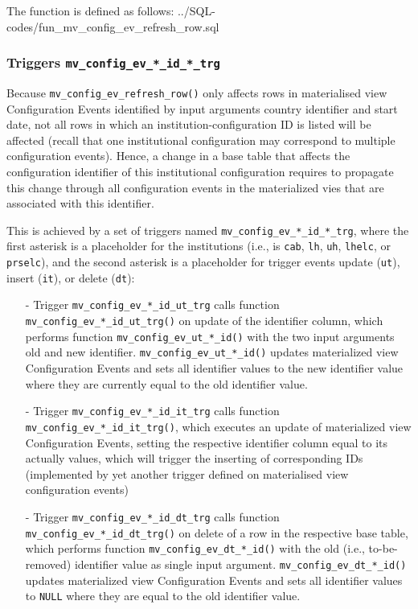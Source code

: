 The function is defined as follows:
%
{../SQL-codes/fun_mv_config_ev_refresh_row.sql}

\subsubsection{Triggers \texttt{mv\_config\_ev\_*\_id\_*\_trg}}

Because \texttt{mv\_config\_ev\_refresh\_row()} only affects rows in materialised view Configuration Events identified by input arguments country identifier and start date, not all rows in which an institution-configuration ID is listed will be affected (recall that one institutional configuration may correspond to multiple configuration events).
Hence, a change in a base table that affects the configuration identifier of this institutional configuration requires to propagate this change through all configuration events in the materialized vies that are associated with this identifier. 

This is achieved by a set of triggers named \texttt{mv\_config\_ev\_*\_id\_*\_trg}, where the first asterisk is a placeholder for the institutions (i.e., is \texttt{cab}, \texttt{lh}, \texttt{uh}, \texttt{lhelc}, or \texttt{prselc}), and the second asterisk is a placeholder for trigger events update (\texttt{ut}), insert (\texttt{it}), or delete (\texttt{dt}):
\begin{itemize}
\item[-]Trigger \texttt{mv\_config\_ev\_*\_id\_ut\_trg} calls function \texttt{mv\_config\_ev\_*\_id\_ut\_trg()} on update of the identifier column, which performs function \texttt{mv\_config\_ev\_ut\_*\_id()} with the two input arguments old and new identifier.
\texttt{mv\_config\_ev\_ut\_*\_id()} updates materialized view Configuration Events and sets all identifier values to the new identifier value where they are currently equal to the old identifier value.

\item[-]Trigger \texttt{mv\_config\_ev\_*\_id\_it\_trg} calls function \texttt{mv\_config\_ev\_*\_id\_it\_trg()}, which executes an update of materialized view Configuration Events, setting the respective identifier column equal to its actually values, which will trigger the inserting of corresponding IDs (implemented by yet another trigger defined on materialised view configuration events)

\item[-]Trigger \texttt{mv\_config\_ev\_*\_id\_dt\_trg} calls function \texttt{mv\_config\_ev\_*\_id\_dt\_trg()} on delete of a row in the respective base table, which performs function \texttt{mv\_config\_ev\_dt\_*\_id()} with the old (i.e., to-be-removed) identifier value as single input argument.
\texttt{mv\_config\_ev\_dt\_*\_id()} updates materialized view Configuration Events and sets all identifier values to \texttt{NULL} where they are equal to the old identifier value.
\end{itemize}
